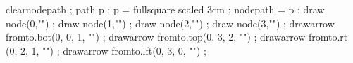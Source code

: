 \startMPpage
clearnodepath ;
path p ; p = fullsquare scaled 3cm ;
nodepath = p ;
draw node(0,"") ;
draw node(1,"") ;
draw node(2,"") ;
draw node(3,"") ;
drawarrow fromto.bot(0, 0, 1, "") ;
drawarrow fromto.top(0, 3, 2, "") ;
drawarrow fromto.rt (0, 2, 1, "") ;
drawarrow fromto.lft(0, 3, 0, "") ;
\stopMPpage
